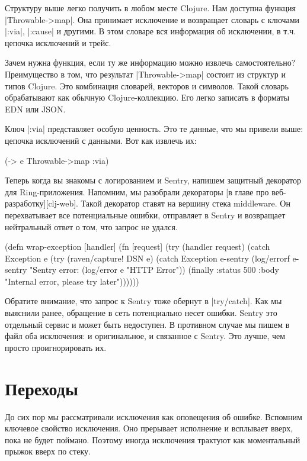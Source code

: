 Структуру выше легко получить в любом месте Clojure. Нам доступна функция
\spverb|Throwable->map|. Она принимает исключение и возвращает словарь с ключами
\spverb|:via|, \spverb|:cause| и другими. В этом словаре вся информация об исключении, в
т.ч. цепочка исключений и трейс.

Зачем нужна функция, если ту же информацию можно извлечь самостоятельно?
Преимущество в том, что результат \spverb|Throwable->map| состоит из структур и типов
Clojure. Это комбинация словарей, векторов и символов. Такой словарь
обрабатывают как обычную Clojure-коллекцию. Его легко записать в форматы EDN или
JSON.

Ключ \spverb|:via| представляет особую ценность. Это те данные, что мы привели выше:
цепочка исключений с данными. Вот как извлечь их:

\begin{code}
(-> e Throwable->map :via)
\end{code}

Теперь когда вы знакомы с логированием и Sentry, напишем защитный декоратор для
Ring-приложения. Напомним, мы разобрали декораторы [в главе про
веб-разработку][clj-web]. Такой декоратор ставят на вершину стека middleware. Он
перехватывает все потенциальные ошибки, отправляет в Sentry и возвращает
нейтральный ответ о том, что запрос не удался.

\begin{code}
(defn wrap-exception
  [handler]
  (fn [request]
    (try
      (handler request)
      (catch Exception e
        (try
          (raven/capture! DSN e)
          (catch Exception e-sentry
            (log/errorf e-sentry "Sentry error: %
            (log/error e "HTTP Error"))
          (finally
            {:status 500
             :body "Internal error, please try later"}))))))
\end{code}

Обратите внимание, что запрос к Sentry тоже обернут в \spverb|try/catch|. Как мы
выяснили ранее, обращение в сеть потенциально несет ошибки. Sentry это отдельный
сервис и может быть недоступен. В противном случае мы пишем в файл оба
исключения: и оригинальное, и связанное с Sentry. Это лучше, чем просто
проигнорировать их.

\section{Переходы}

До сих пор мы рассматривали исключения как оповещения об ошибке. Вспомним
ключевое свойство исключения. Оно прерывает исполнение и всплывает вверх, пока
не будет поймано. Поэтому иногда исключения трактуют как моментальный прыжок
вверх по стеку.

